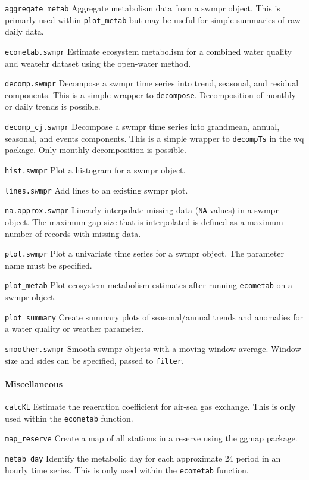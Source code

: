 \documentclass[10pt,letterpaper]{article}\usepackage[]{graphicx}\usepackage[]{color}
\begin{document}
\texttt{aggregate\_metab} Aggregate metabolism data from a swmpr object.  This is primarly used within \texttt{plot\_metab} but may be useful for simple summaries of raw daily data.

\texttt{ecometab.swmpr} Estimate ecosystem metabolism for a combined water quality and weatehr dataset using the open-water method.

\texttt{decomp.swmpr} Decompose a swmpr time series into trend, seasonal, and residual components.  This is a simple wrapper to \texttt{decompose}.  Decomposition of monthly or daily trends is possible.

\texttt{decomp\_cj.swmpr} Decompose a swmpr time series into grandmean, annual, seasonal, and events components.  This is a simple wrapper to \texttt{decompTs} in the wq package.  Only monthly decomposition is possible.

\texttt{hist.swmpr} Plot a histogram for a swmpr object.

\texttt{lines.swmpr} Add lines to an existing swmpr plot.

\texttt{na.approx.swmpr} Linearly interpolate missing data (\texttt{NA} values) in a swmpr object. The maximum gap size that is interpolated is defined as a maximum number of records with missing data. 

\texttt{plot.swmpr} Plot a univariate  time series for a swmpr object.  The parameter name must be specified.

\texttt{plot\_metab} Plot ecosystem metabolism estimates after running \texttt{ecometab} on a swmpr object.  

\texttt{plot\_summary} Create summary plots of seasonal/annual trends and anomalies for a water quality or weather parameter.

\texttt{smoother.swmpr} Smooth swmpr objects with a moving window average.  Window size and sides can be specified, passed to \texttt{filter}.

\paragraph{Miscellaneous}

\texttt{calcKL} Estimate the reaeration coefficient for air-sea gas exchange.  This is only used within the \texttt{ecometab} function.

\texttt{map\_reserve} Create a map of all stations in a reserve using the ggmap package.

\texttt{metab\_day} Identify the metabolic day for each approximate 24 period in an hourly time series.  This is only used within the \texttt{ecometab} function.
\end{document}
